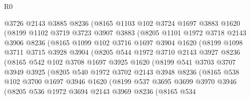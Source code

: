 \begin{lexlean}{R0}
\begin{coremodule}
            @3726
            @2143
            @3885
            @8236
            (@8165
              @1103
              @102
              @3724
              @1697
              @3883
              @1620
              (@8199
                @1102
                @3719
                @3723
                @3907
                @3883
                (@8205
                  @1101
                  @1972
                  @3718
                  @2143
                  @3906
                  @8236
                  (@8165
                    @1099
                    @102
                    @3716
                    @1697
                    @3904
                    @1620
                    (@8199
                      @1098
                      @3711
                      @3715
                      @3928
                      @3904
                      (@8205
                        @544
                        @1972
                        @3710
                        @2143
                        @3927
                        @8236
                        (@8165
                          @542
                          @102
                          @3708
                          @1697
                          @3925
                          @1620
                          (@8199
                            @541
                            @3703
                            @3707
                            @3949
                            @3925
                            (@8205
                              @540
                              @1972
                              @3702
                              @2143
                              @3948
                              @8236
                              (@8165
                                @538
                                @102
                                @3700
                                @1697
                                @3946
                                @1620
                                (@8199
                                  @537
                                  @3695
                                  @3699
                                  @3970
                                  @3946
                                  (@8205
                                    @536
                                    @1972
                                    @3694
                                    @2143
                                    @3969
                                    @8236
                                    (@8165
                                      @534

\end{coremodule}
\end{lexlean}
